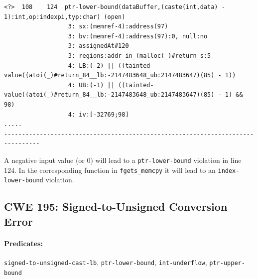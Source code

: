 \documentclass[11pt]{article}
\begin{document}
\begin{tiny}
\begin{verbatim}
<?>  108    124  ptr-lower-bound(dataBuffer,(caste(int,data) - 1):int,op:indexpi,typ:char) (open)
                  3: sx:(memref-4):address(97)
                  3: bv:(memref-4):address(97):0, null:no
                  3: assignedAt#120
                  3: regions:addr_in_(malloc(_)#return_s:5
                  4: LB:(-2) || ((tainted-value((atoi(_)#return_84__lb:-2147483648_ub:2147483647)(85) - 1))
                  4: UB:(-1) || ((tainted-value((atoi(_)#return_84__lb:-2147483648_ub:2147483647)(85) - 1) && 98)
                  4: iv:[-32769;98] 
.....
-------------------------------------------------------------------------------- 
\end{verbatim}
\end{tiny}
A negative input value (or 0) will lead to a {\tt ptr-lower-bound} violation in line 124. In the
corresponding function in {\tt fgets\_memcpy} it will lead to an {\tt index-lower-bound} violation.

\subsection{CWE 195: Signed-to-Unsigned Conversion Error}

\paragraph{Predicates:} {\tt signed-to-unsigned-cast-lb}, {\tt ptr-lower-bound},
{\tt int-underflow}, {\tt ptr-upper-bound}
\end{document}
